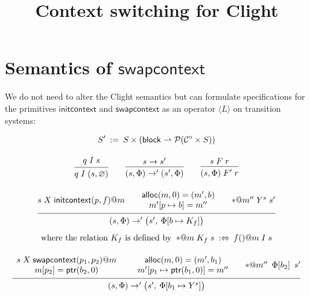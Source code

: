 \documentclass{article}
\title{Context switching for Clight}
\newcommand\kw[1]{\mathsf{#1}}
\begin{document}
\maketitle

\section{Semantics of $\kw{swapcontext}$}

We do not need to alter the Clight semantics
but can formulate specifications for the primitives
$\kw{initcontext}$ and $\kw{swapcontext}$
as an operator $\langle L \rangle$ on transition systems:

\begin{gather*}
  S' \: := \: S \times (\kw{block} \rightharpoonup \mathcal{P}(\mathcal{C}^\circ \times S))
  \\[1em]
  \begin{prooftree}
    \hypo{q \mathrel{I} s}
    \infer1{q \mathrel{I} (s, \varnothing)}
  \end{prooftree}
  \qquad
  \begin{prooftree}
    \hypo{s \rightarrow s'}
    \infer1{(s, \Phi) \rightarrow' (s', \Phi)}
  \end{prooftree}
  \qquad
  \begin{prooftree}
    \hypo{s \mathrel{F} r}
    \infer1{(s, \Phi) \mathrel{F'} r}
  \end{prooftree}
  \\[1em]
  \begin{prooftree}
    \hypo{s \mathrel{X} \kw{initcontext}(p, f) @ m}
    \hypo{
      \begin{array}{c}
        \kw{alloc}(m, 0) = (m', b) \\
        m'[p \mapsto b] = m''
      \end{array}
    }
    \hypo{* @ m'' \mathrel{Y^s} s'}
    \infer3{(s, \Phi) \rightarrow' \big( s', \: \Phi[b \mapsto K_f] \big)}
  \end{prooftree}
  \\[1ex]
  \text{where the relation $K_f$ is defined by } \:
    {*}@m \mathrel{K_f} s \: :\Leftrightarrow \: f()@m \mathrel{I} s
  \\[1em]
  \begin{prooftree}
    \hypo{
      \begin{array}{c}
        s \mathrel{X} \kw{swapcontext}(p_1, p_2) @ m \\
        m[p_2] = \kw{ptr}(b_2, 0)
      \end{array}
    }
    \hypo{
      \begin{array}{c}
        \kw{alloc}(m, 0) = (m', b_1) \\
        m'[p_1 \mapsto \kw{ptr}(b_1,0)] = m''
      \end{array}
    }
    \hypo{{*}@m'' \: \mathrel{\Phi[b_2]} \: s'}
    \infer3{(s, \Phi) \rightarrow' \big(s', \: \Phi[b_1 \mapsto Y^s] \big)}
  \end{prooftree}
\end{gather*}
\end{document}
